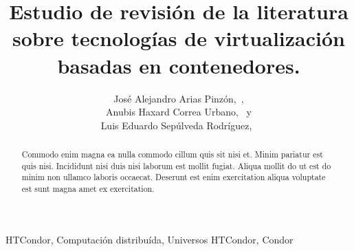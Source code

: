 \documentclass[]{IEEEtran}
\begin{document}
\renewcommand{\thesection}{\arabic{section}}
\renewcommand{\thesubsection}{\thesection.\arabic{subsection}}
\renewcommand{\thesubsubsection}{\thesubsection.\arabic{subsubsection}}

\title{
    Estudio de revisión de la literatura sobre tecnologías de virtualización basadas en contenedores.
}

\author{
    José Alejandro Arias Pinzón,~, \\
    Anubis Haxard Correa Urbano,~ y \\
    Luis Eduardo Sepúlveda Rodríguez,~
}



\maketitle

\begin{abstract}
Commodo enim magna ea nulla commodo cillum quis sit nisi et. Minim pariatur est quis nisi. Incididunt nisi duis nisi laborum est mollit fugiat. Aliqua mollit do ut est do minim non ullamco laboris occaecat. Deserunt est enim exercitation aliqua voluptate est sunt magna amet ex exercitation.
\end{abstract}


\begin{IEEEkeywords}
HTCondor, Computación distribuída, Universos HTCondor, Condor
\end{IEEEkeywords}

















%




\end{document}
